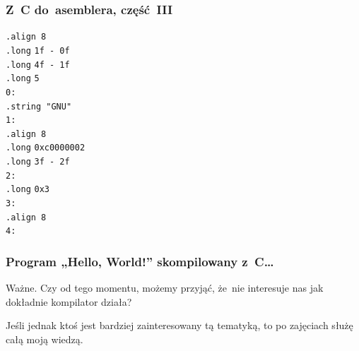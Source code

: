 \documentclass[10pt,t]{beamer}
\begin{document}
\begin{frame}
  \frametitle{Z~C do~asemblera, część~III}


  \hphantom{aaaaa} \texttt{.align 8} \\
  \hphantom{aaaaa} \texttt{.long} \hphantom{aaa} \texttt{1f - 0f} \\
  \hphantom{aaaaa} \texttt{.long} \hphantom{aaa} \texttt{4f - 1f} \\
  \hphantom{aaaaa} \texttt{.long} \hphantom{aaa} \texttt{5} \\
  \texttt{0:} \\
  \hphantom{aaaaa} \texttt{.string "GNU"} \\
  \texttt{1:} \\
  \hphantom{aaaaa} \texttt{.align 8} \\
  \hphantom{aaaaa} \texttt{.long} \hphantom{aaa} \texttt{0xc0000002} \\
  \hphantom{aaaaa} \texttt{.long} \hphantom{aaa} \texttt{3f - 2f} \\
  \texttt{2:} \\
  \hphantom{aaaaa} \texttt{.long} \hphantom{aaa} \texttt{0x3} \\
  \texttt{3:} \\
  \hphantom{aaaaa} \texttt{.align 8} \\
  \texttt{4:}

\end{frame}





\begin{frame}
  \frametitle{Program „Hello, World!” skompilowany z~C\ldots}


  \alert{Ważne.} Czy od tego momentu, możemy przyjąć, że~nie interesuje
  nas jak dokładnie kompilator działa?

  Jeśli jednak ktoś jest bardziej zainteresowany tą tematyką, to po
  zajęciach służę całą moją wiedzą.

\end{frame}
\end{document}
